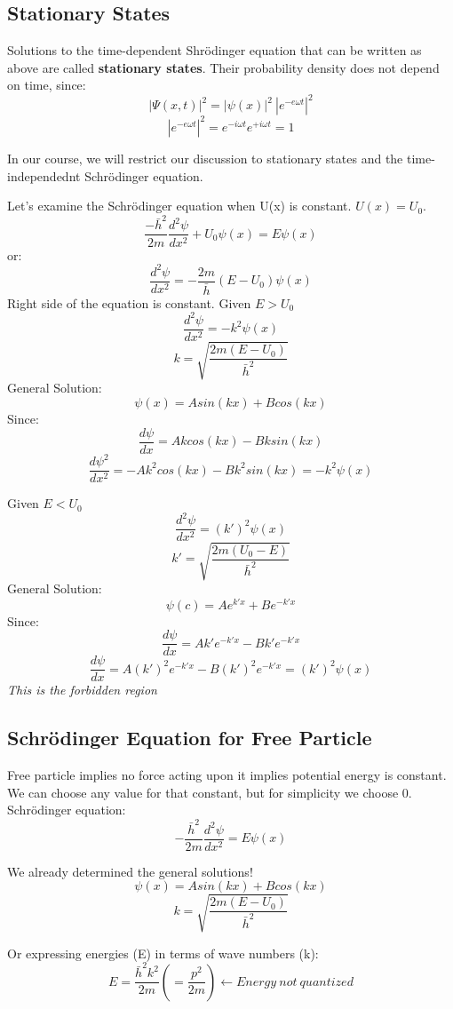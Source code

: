 \documentclass[class=article,crop=false]{standalone}
\begin{document}
\subsection{Stationary States}
Solutions to the time-dependent Shrödinger equation that can be written as above are called \textbf{stationary states}. Their probability density does not depend on time, since:
$$ |\Psi(x,t)|^2 = |\psi(x)|^2\ |e^{-e\omega t}|^2 $$
$$ |e^{-e\omega t}|^2 = e^{-i\omega t} e^{+i\omega t} = 1 $$


In our course, we will restrict our discussion to stationary states and the time-independednt Schrödinger equation.

\begin{result}
	Let's examine the Schrödinger equation when U(x) is constant. $U(x) = U_0$.
	$$ \frac{-\bar{h}^2}{2m}\frac{d^2\psi}{dx^2} + U_0 \psi(x) = E \psi(x) $$
	or:
	$$ \frac{d^2\psi}{dx^2} = -\frac{2m}{\bar{h}} (E - U_0) \psi(x) $$
	Right side of the equation is constant.
	Given $ E > U_0$
	$$ \frac{d^2\psi}{dx^2} = -k^2 \psi(x) $$
	$$ k = \sqrt{\frac{2m(E-U_0)}{\bar{h}^2}} $$
	General Solution:
	$$ \psi(x) = Asin(kx) + Bcos(kx) $$
	Since:
	$$ \frac{d\psi}{dx} = Ak cos(kx) - Bk sin(kx) $$
	$$ \frac{d\psi^2}{dx^2} = - Ak^2 cos(kx) - Bk^2 sin(kx) = -k^2 \psi(x) $$

	Given $ E < U_0$
	$$ \frac{d^2\psi}{dx^2} = (k')^2 \psi(x)$$
	$$ k' = \sqrt{\frac{2m(U_0 - E)}{\bar{h}^2}} $$
	General Solution:
	$$ \psi(c) = Ae^{k'x} + Be^{-k'x} $$
	Since:
	$$ \frac{d\psi}{dx} = Ak'e^{-k'x} - Bk'e^{-k'x} $$
	$$ \frac{d\psi}{dx} = A(k')^2e^{-k'x} - B(k')^2e^{-k'x} = (k')^2 \psi(x) $$
	\emph{This is the forbidden region}
\end{result}

\subsection{Schrödinger Equation for Free Particle}
Free particle implies no force acting upon it implies potential energy is constant. We can choose any value for that constant, but for simplicity we choose 0. \\

Schrödinger equation:
$$ -\frac{\bar{h}^2}{2m} \frac{d^2\psi}{dx^2} = E\psi(x) $$

We already determined the general solutions!
$$ \psi(x) = Asin(kx) + Bcos(kx) $$
$$ k = \sqrt{\frac{2m(E-U_0)}{\bar{h}^2}} $$

Or expressing energies (E) in terms of wave numbers (k):
$$ E = \frac{\bar{h}^2k^2}{2m} \left( = \frac{p^2}{2m} \right) \leftarrow Energy\ not\ quantized $$
\end{document}
